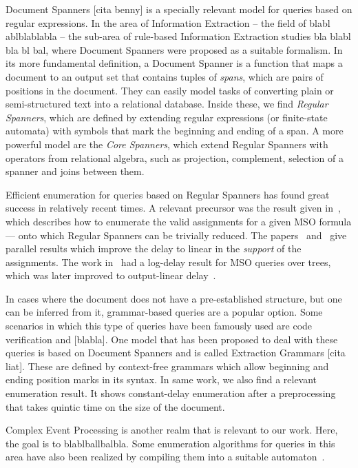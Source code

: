 Document Spanners [cita benny] is a specially relevant model for queries based on regular expressions. In the area of Information Extraction -- the field of blabl ablblablabla -- the sub-area of rule-based Information Extraction studies bla blabl bla bl bal, where Document Spanners were proposed as a suitable formalism.  In its more fundamental definition, a Document Spanner is a function that maps a document to an output set that contains tuples of {\it spans}, which are pairs of positions in the document. They can easily model tasks of converting plain or semi-structured text into a relational database. Inside these, we find {\it Regular Spanners}, which are defined by extending regular expressions (or finite-state automata) with symbols that mark the beginning and ending of a span. A more powerful model are the {\it Core Spanners}, which extend Regular Spanners with operators from relational algebra, such as projection, complement, selection of a spanner and joins between them. 

Efficient enumeration for queries based on Regular Spanners has found great success in relatively recent times. A relevant precursor was the result given in~\cite{bagan2006mso}, which describes how to enumerate the valid assignments for a given MSO formula --- onto which Regular Spanners can be trivially reduced. The papers~\cite{FlorenzanoRUVV20} and~\cite{amarilli2019constant} give parallel results which improve the delay to linear in the {\it support} of the assignments. The work in~\cite{Niewerth18} had a log-delay result for MSO queries over trees, which was later improved to output-linear delay~\cite{amarilli2019enumeration}. 

In cases where the document does not have a pre-established structure, but one can be inferred from it, grammar-based queries are a popular option. Some scenarios in which this type of queries have been famously used are code verification and [blabla]. One model that has been proposed to deal with these queries is based on Document Spanners and is called Extraction Grammars [cita liat]. These are defined by context-free grammars which allow beginning and ending position marks in its syntax. 
In same work, we also find a relevant enumeration result. It shows constant-delay enumeration after a preprocessing that takes quintic time on the size of the document.

Complex Event Processing is another realm that is relevant to our work. Here, the goal is to blablballbalbla. Some enumeration algorithms for queries in this area have also been realized by compiling them into a suitable automaton~\cite{GrezRU19,GrezR20,BucchiGQRV22}.



